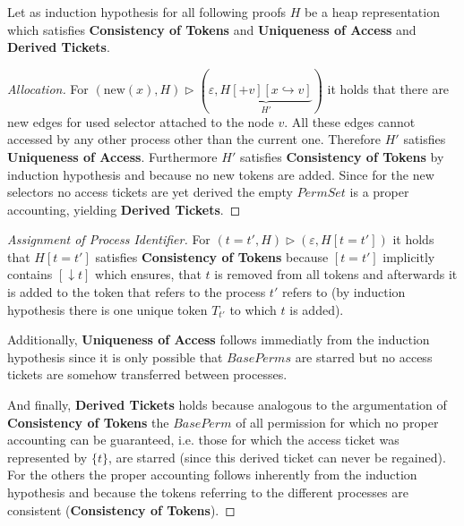 	Let as induction hypothesis for all following proofs $H$ be a heap
	representation which satisfies \textbf{Consistency of Tokens} and
	\textbf{Uniqueness of Access} and \textbf{Derived Tickets}.
	\begin{proof}[Allocation]
		For $(\text{new}(x), H)\rhd(\varepsilon,
		\underbrace{H[+v][x\hookrightarrow v]}_{H'})$ it holds that there
		are new edges for used selector attached to the node $v$. All these edges
		cannot accessed by any other process other than
		the current one. Therefore $H'$ satisfies \textbf{Uniqueness of Access}.
		Furthermore $H'$ satisfies \textbf{Consistency of Tokens} by induction
		hypothesis and because no new tokens are added. Since for the new
		selectors no access tickets are yet derived the empty $\mathit{PermSet}$
		is a proper accounting, yielding \textbf{Derived Tickets}.
	\end{proof}

	\begin{proof}[Assignment of Process Identifier]
		For $(t = t', H)\rhd(\varepsilon, H[t = t'])$ it holds that $H[t = t']$
		satisfies \textbf{Consistency of Tokens} because $[t = t']$ implicitly
		contains $[\downarrow t]$ which ensures, that $t$ is removed from all
		tokens and afterwards it is added to the token that refers to the process
		$t'$ refers to (by induction hypothesis there is one unique token
		$T_{t'}$ to which $t$ is added).

		Additionally, \textbf{Uniqueness of Access} follows immediatly from the
		induction hypothesis since it is only possible that $\mathit{BasePerms}$
		are starred but no access tickets are somehow transferred between
		processes.
		
		And finally, \textbf{Derived Tickets} holds because analogous to the
		argumentation of \textbf{Consistency of Tokens} the $\mathit{BasePerm}$
		of all permission for which no proper accounting can be guaranteed, i.e.
		those for which the access ticket was represented by $\{t\}$, are
		starred (since this derived ticket can never be regained). For the others
		the proper accounting follows inherently from the induction hypothesis
		and because the tokens referring to the different processes are
		consistent (\textbf{Consistency of Tokens}).
	\end{proof}

